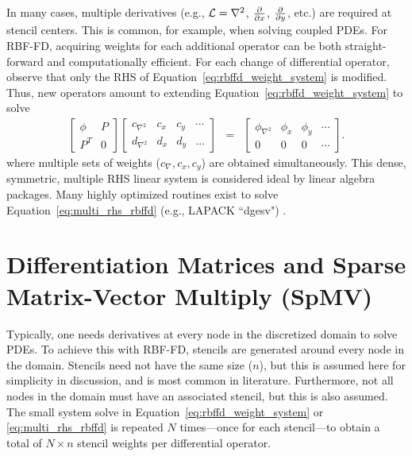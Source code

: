 \documentclass[11pt]{report}
\begin{document}
{In many cases, multiple derivatives (e.g., $\mathcal{L} = \nabla^2$, $\frac{\partial }{\partial x}$, $\frac{\partial }{\partial y}$, etc.) are required at stencil centers. This is common, for example, when solving coupled PDEs. For RBF-FD, acquiring weights for each additional operator can be both straight-forward and computationally efficient. For each change of differential operator, observe that only the RHS of Equation~\ref{eq:rbffd_weight_system} is modified. Thus, new operators amount to extending Equation~\ref{eq:rbffd_weight_system} to solve 
\begin{eqnarray}
    \begin{bmatrix} \phi & P \\
		P^T & 0 \end{bmatrix} \begin{bmatrix} c_{\nabla^2} & c_{x} & c_{y} & \cdots \\ 
							d_{\nabla^2} & d_{x} & d_{y} & \dots \end{bmatrix} & = &     
		\begin{bmatrix} \phi_{\nabla^2} & \phi_{x} & \phi_{y} & \cdots \\
							0 & 0 & 0 & \cdots \end{bmatrix}. \label{eq:multi_rhs_rbffd}
	\end{eqnarray}
where multiple sets of weights ($c_\nabla, c_x, c_y$) are obtained simultaneously. This dense, symmetric, multiple RHS linear system is considered ideal by linear algebra packages. Many highly optimized routines exist to solve Equation~\ref{eq:multi_rhs_rbffd} (e.g., LAPACK ``dgesv") \cite{Lapack1999}. 



\section{Differentiation Matrices and Sparse Matrix-Vector Multiply (SpMV)}


Typically, one needs derivatives at every node in the discretized domain to solve PDEs. To achieve this with RBF-FD, stencils are generated around every node in the domain. Stencils need not have the same size ($n$), but this is assumed here for simplicity in discussion, and is most common in literature. Furthermore, not all nodes in the domain must have an associated stencil, but this is also assumed. The small system solve in Equation~\ref{eq:rbffd_weight_system} or \ref{eq:multi_rhs_rbffd}  is repeated $N$ times---once for each stencil---to obtain a total of $N \times n$ stencil weights per differential operator. 

}
\end{document}
